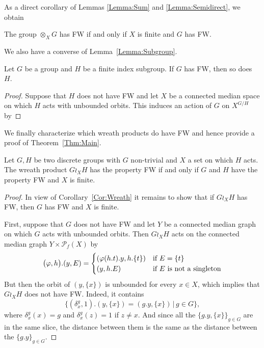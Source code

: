 \begin{lem}
As a direct corollary of Lemmas \ref{Lemma:Sum} and \ref{Lemma:Semidirect}, we obtain
\begin{cor}\label{Cor:Sum}
The group $\otimes_X G$ has FW if and only if $X$ is finite and $G$ has FW.
\end{cor}


We also have a converse of Lemma~\ref{Lemma:Subgroup}.
\begin{lem}\label{Lemma:Subgroup2}
Let $G$ be a group and $H$ be a finite index subgroup.
If $G$ has FW, then so does~$H$.
\end{lem}
\begin{proof}
Suppose that $H$ does not have FW and let $X$ be a connected median space on which $H$ acts with unbounded orbits.
This induces an action of $G$ on $X^{G/H}$ by
\end{proof}







We finally characterize which wreath products do have FW and hence provide a proof of Theorem~\ref{Thm:Main}.
\begin{prop}\label{Prop:Median}
Let $G,H$ be two discrete groups with $G$ non-trivial and $X$ a set on which $H$ acts. The wreath product $G \wr_X H$ has the property FW if and only if $G$ and $H$ have the property FW and $X$ is finite.
\end{prop}
\begin{proof}
In view of Corollary~\ref{Cor:Wreath} it remains to show that if $G\wr_X H$ has FW, then $G$ has FW and $X$ is finite.

First, suppose that $G$ does not have FW and let $Y$ be a connected median graph on which $G$ acts with unbounded orbits.
Then $G\wr_X H$ acts on the connected median graph $Y\times \mathcal P_f(X)$ by
\[
	\bigl(\phi,h\bigr).(y,E)=
	\begin{cases}
	(\phi(h.t).y,h.\{t\})&\textnormal{if $E=\{t\}$}\\
	(y,h.E)&\textnormal{if $E$ is not a singleton}
	\end{cases}
\]
But then the orbit of $(y,\{x\})$ is unbounded for every $x\in X$, which implies that $G\wr_X H$ does not have FW.
Indeed, it contains
\[
	\{(\delta_{x}^g,1).(y,\{x\})=(g.y,\{x\})\,|\,g\in G\},
\]
where $\delta_{x}^g(x)=g$ and $\delta_{x}^g(z)=1$ if $z\neq x$. 
And since all the $\{g.y,\{x\}\}_{g\in G}$ are in the same slice, the distance between them is the same as the distance between the $\{g.y\}_{g\in G}$.


\end{proof}
\end{lem}
